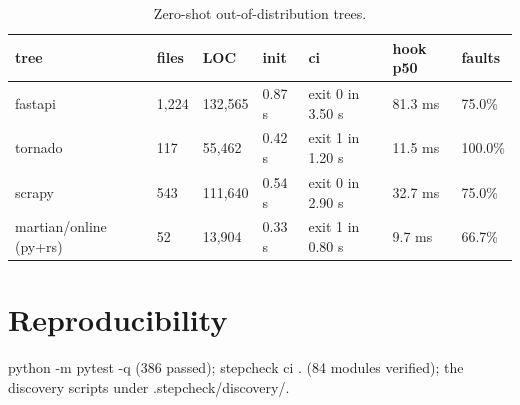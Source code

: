 \documentclass{article}
\begin{document}
\begin{table}[h]
\centering
\begin{tabular}{lllllll}
\toprule
tree & files & LOC & init & ci & hook p50 & faults \\
\midrule
fastapi & 1,224 & 132,565 & 0.87 s & exit 0 in 3.50 s & 81.3 ms & 75.0\% \\
tornado & 117 & 55,462 & 0.42 s & exit 1 in 1.20 s & 11.5 ms & 100.0\% \\
scrapy & 543 & 111,640 & 0.54 s & exit 0 in 2.90 s & 32.7 ms & 75.0\% \\
martian/online (py+rs) & 52 & 13,904 & 0.33 s & exit 1 in 0.80 s & 9.7 ms & 66.7\% \\
\bottomrule
\end{tabular}
\caption{Zero-shot out-of-distribution trees.}
\label{tab:ood}
\end{table}
\section{Reproducibility}
python -m pytest -q (386 passed); stepcheck ci . (84 modules verified); the discovery scripts under .stepcheck/discovery/.
\end{document}
